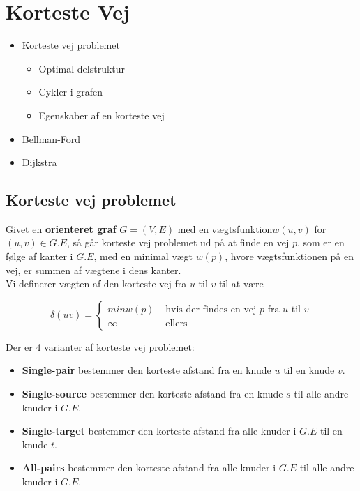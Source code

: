 \section{Korteste Vej}
\hrulefill
\begin{itemize}
\item Korteste vej problemet
  \begin{itemize}
  \item Optimal delstruktur
  \item Cykler i grafen
  \item Egenskaber af en korteste vej
  \end{itemize}
\item Bellman-Ford
\item Dijkstra
\end{itemize}

\newpage
\subsection{Korteste vej problemet}
Givet en \textbf{orienteret graf} $G = (V,E)$ med en vægtsfunktion$w(u,v)$ for $(u,v) \in G.E$, så går korteste vej problemet ud på at finde en vej $p$, som er en følge af kanter i $G.E$, med en minimal vægt $w(p)$, hvore vægtsfunktionen på en vej, er summen af vægtene i dens kanter.\\

Vi definerer vægten af den korteste vej fra $u$ til $v$ til at være

$$
\delta(uv) =
\begin{cases}
  min{w(p)} & \text{ hvis der findes en vej } p \text{ fra } u \text{ til } v\\
  \infty & \text{ ellers}
\end{cases}
$$

Der er 4 varianter af korteste vej problemet:
\begin{itemize}
\item \textbf{Single-pair} bestemmer den korteste afstand fra en knude $u$ til en knude $v$.
\item \textbf{Single-source} bestemmer den korteste afstand fra en knude $s$ til alle andre knuder i $G.E$.
\item \textbf{Single-target} bestemmer den korteste afstand fra alle knuder i $G.E$ til en knude $t$.
\item \textbf{All-pairs} bestemmer den korteste afstand fra alle knuder i $G.E$ til alle andre knuder i $G.E$.
\end{itemize}

